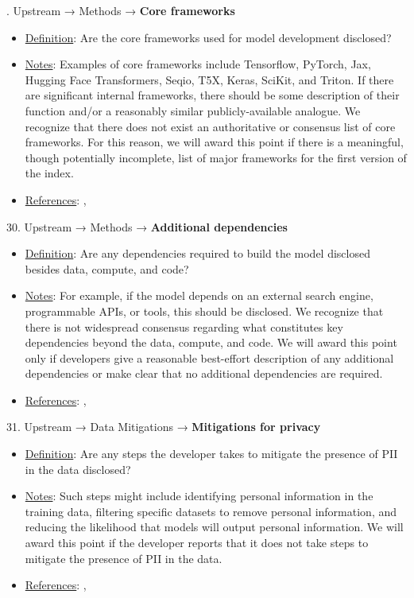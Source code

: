 . Upstream → Methods → \textbf{Core frameworks}
\vspace{-\parskip}
\begin{itemize}
\item
\underline{Definition}: Are the core frameworks used for model development disclosed?
\item
\underline{Notes}: Examples of core frameworks include Tensorflow, PyTorch, Jax, Hugging Face Transformers, Seqio, T5X, Keras, SciKit, and Triton. If there are significant internal frameworks, there should be some description of their function and/or a reasonably similar publicly-available analogue. We recognize that there does not exist an authoritative or consensus list of core frameworks. For this reason, we will award this point if there is a meaningful, though potentially incomplete, list of major frameworks for the first version of the index.
\item
\underline{References}: \citet{mitchell2019model}, \citet{chung2022scaling}
\end{itemize}


30. Upstream → Methods → \textbf{Additional dependencies}
\vspace{-\parskip}
\begin{itemize}
\item
\underline{Definition}: Are any dependencies required to build the model disclosed besides data, compute, and code?
\item
\underline{Notes}: For example, if the model depends on an external search engine, programmable APIs, or tools, this should be disclosed. We recognize that there is not widespread consensus regarding what constitutes key dependencies beyond the data, compute, and code. We will award this point only if developers give a reasonable best-effort description of any additional dependencies or make clear that no additional dependencies are required.
\item
\underline{References}: \citet{lukas2023analyzing}, \citet{kim2023propile}
\end{itemize}


31. Upstream → Data Mitigations → \textbf{Mitigations for privacy}
\vspace{-\parskip}
\begin{itemize}
\item
\underline{Definition}: Are any steps the developer takes to mitigate the presence of PII in the data disclosed?
\item
\underline{Notes}: Such steps might include identifying personal information in the training data, filtering specific datasets to remove personal information, and reducing the likelihood that models will output personal information. We will award this point if the developer reports that it does not take steps to mitigate the presence of PII in the data.
\item
\underline{References}: \citet{kandpal2022deduplicating}, \citet{genlaw2023}
\end{itemize}


